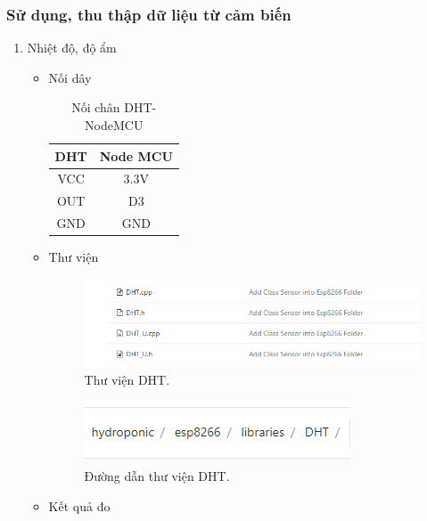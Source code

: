 \documentclass[a4paper,12pt,oneside]{article}
\begin{document}
\subsubsection{Sử dụng, thu thập dữ liệu từ cảm biến}
	\begin{enumerate}
	\item Nhiệt độ, độ ẩm
		\begin{itemize}
			\item Nối dây
			\begin{table}[!htp]
		    \centering
				\begin{tabular}{|c|c|}
				\hline 
				DHT & Node MCU \\ 
				\hline 
				VCC & 3.3V \\ 
				\hline 
				OUT & D3 \\ 
				\hline 
				GND & GND \\ 
				\hline 
				\end{tabular} 
			\caption{Nối chân DHT-NodeMCU}
			\end{table}
			
			\item Thư viện
			
			\begin{figure}[H]
			\centering
			\begin{center}
			\includegraphics[scale=.7]{hinh/lib_DHT.PNG}
			\end{center}
			\caption{Thư viện DHT.}
			\end{figure}
			
			\begin{figure}[H]
			\centering
			\begin{center}
			\includegraphics[scale=.7]{hinh/path_DHT.PNG}
			\end{center}
			\caption{Đường dẫn thư viện DHT.}
			\end{figure}
			
			\item Kết quả đo
			

\end{itemize}
\end{enumerate}
\end{document}
